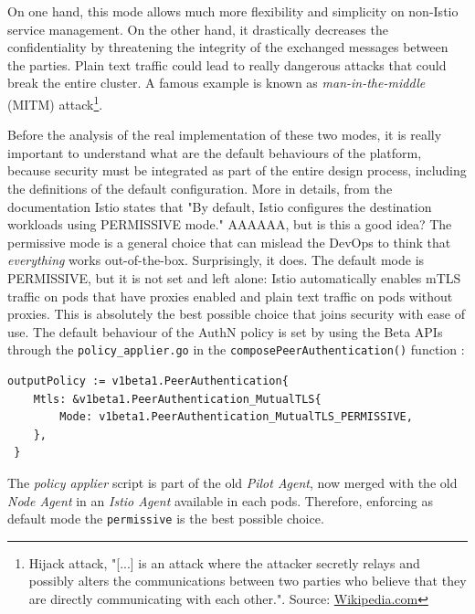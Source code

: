 On one hand, this mode allows much more flexibility and simplicity on non-Istio service management. On the other hand, it drastically decreases the confidentiality by threatening the integrity of the exchanged messages between the parties. Plain text traffic could lead to really dangerous attacks that could break the entire cluster. A famous example is known as \textit{man-in-the-middle} (MITM) attack\footnote{Hijack attack, "[...] is an attack where the attacker secretly relays and possibly alters the communications between two parties who believe that they are directly communicating with each other.". Source: \href{https://en.wikipedia.org/wiki/Man-in-the-middle_attack}{Wikipedia.com}}.

Before the analysis of the real implementation of these two modes, it is really important to understand what are the default behaviours of the platform, because security must be integrated as part of the entire design process, including the definitions of the default configuration. More in details, from the documentation Istio states that "By default, Istio configures the destination workloads using PERMISSIVE mode." AAAAAA, but is this a good idea? The permissive mode is a general choice that can mislead the DevOps to think that \textit{everything} works out-of-the-box. Surprisingly, it does. The default mode is PERMISSIVE, but it is not set and left alone: Istio automatically enables mTLS traffic on pods that have proxies enabled and plain text traffic on pods without proxies. This is absolutely the best possible choice that joins security with ease of use. The default behaviour of the AuthN policy is set by using the Beta APIs through the \texttt{policy\_applier.go} in the \texttt{composePeerAuthentication()} function \cite{istiocode}:
\vspace{0.3cm}
\begin{lstlisting}[title={\href{https://github.com/istio/istio/blob/ec8b8ba452b372b8ceaf8a5dea973bc561bf39b4/pilot/pkg/security/authn/v1beta1/policy\_applier.go\#L411}{GitHub permalink}}]
 outputPolicy := v1beta1.PeerAuthentication{
    Mtls: &v1beta1.PeerAuthentication_MutualTLS{
        Mode: v1beta1.PeerAuthentication_MutualTLS_PERMISSIVE,
    },
 }

\end{lstlisting}


The \textit{policy applier} script is part of the old \textit{Pilot Agent}, now merged with the old \textit{Node Agent} in an \textit{Istio Agent} available in each pods. Therefore, enforcing as default mode the \texttt{permissive} is the best possible choice.

